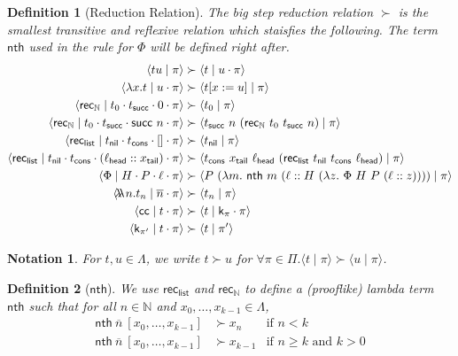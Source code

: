 \documentclass{article}
\newcommand{\successor}{\mathsf{succ}}
\newcommand{\N}{\mathbb{N}}
\newcommand{\recN}{\mathsf{rec}_{\mathbb{N}}}
\newcommand{\true}{\mathsf{true}}
\newcommand{\false}{\mathsf{false}}
\newcommand{\recbool}{\mathsf{rec_{bool}}}
\newcommand{\proc}[2]{\langle{#1}\mid{#2}\rangle}
\newcommand{\oracle}[2]{\lambda\mkern-15mu\lambda\ #1. #2}
\newcommand{\cc}{\mathsf{cc}}
\newcommand{\cont}{\mathsf{k}}
\newcommand{\cons}{\mathsf{cons}}
\newcommand{\nil}{\mathsf{nil}}
\newcommand{\reclist}{\mathsf{rec}_\mathsf{list}}
\newcommand{\nth}{\mathsf{nth}}
\newtheorem{definition}{Definition}
\newtheorem{notation}{Notation}
\begin{document}
\begin{definition}[Reduction Relation]
    The big step reduction relation $\succ$ is the smallest transitive and reflexive relation which staisfies the following. The term $\nth$ used in the rule for $\Phi$ will be defined right after.
    \begin{align*}
        \proc{t u}{\pi} & \succ \proc{t}{u \cdot \pi} \\
        \proc{\lambda x. t}{u \cdot \pi} & \succ \proc{t[x := u]}{\pi} \\
        \proc{\recN}{t_0 \cdot t_\successor \cdot 0 \cdot \pi} & \succ \proc{t_0}{\pi} \\
        \proc{\recN}{t_0 \cdot t_\successor \cdot \successor\ n \cdot \pi} & \succ \proc{t_\successor\ n\ (\recN\ t_0\ t_\successor\ n)}{\pi} \\
        \proc{\reclist}{t_\nil \cdot t_\cons \cdot [] \cdot \pi} & \succ \proc{t_\nil}{\pi} \\
        \proc{\reclist}{t_\nil \cdot t_\cons \cdot (\ell_\mathsf{head} :: x_\mathsf{tail}) \cdot \pi} & \succ \proc{t_\cons\ x_\mathsf{tail}\ \ell_\mathsf{head}\ (\reclist\ t_\nil\ t_\cons\ \ell_\mathsf{head})}{\pi} \\
        \proc{\Phi}{H \cdot P \cdot \ell \cdot \pi} & \succ \proc{P\ (\lambda m.\ \nth\ m\ (\ell :: H\ (\lambda z.\ \Phi\ H\ P\ (\ell :: z))))}{\pi} \\
        \proc{\oracle{n}{t_n}}{\overline{n} \cdot \pi} & \succ \proc{t_n}{\pi} \\
        \proc{\cc}{t \cdot \pi} & \succ \proc{t}{\cont_\pi \cdot \pi} \\
        \proc{\cont_{\pi'}}{t \cdot \pi} & \succ \proc{t}{\pi'}
    \end{align*}
\end{definition}

\begin{notation}
    For $t, u \in \Lambda$, we write $t \succ u$ for $\forall \pi \in \Pi. \proc{t}{\pi} \succ \proc{u}{\pi}$.
\end{notation}

\begin{definition}[$\nth$]
    We use $\reclist$ and $\recN$ to define a (prooflike) lambda term $\nth$ such that for all $n \in \N$ and $x_0, \dots, x_{k-1} \in \Lambda$,
    \begin{align*}
        \nth\ \overline{n}\ [x_0, \dots, x_{k-1}] & \succ x_n & \text{if $n < k$} \\
        \nth\ \overline{n}\ [x_0, \dots, x_{k-1}] & \succ x_{k-1} & \text{if $n \ge k$ and $k > 0$}
    \end{align*}
\end{definition}
\end{document}
